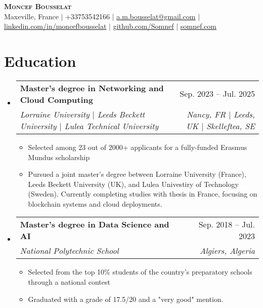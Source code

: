 \documentclass[letterpaper,11t]{article}
\makeatletter
\newcommand{\resumeItem}[1]{
  \item\small{
    {#1 \vspace{-2pt}}
  }
}
\newcommand{\resumeSubheading}[4]{
  \vspace{-2pt}\item
    \begin{tabular*}{0.97\textwidth}[t]{l@{\extracolsep{\fill}}r}
      \textbf{#1} & #2 \\
      \textit{\small#3} & \textit{\small #4} \\
    \end{tabular*}\vspace{-7pt}
}
\newcommand{\resumeSubHeadingListStart}{\begin{itemize}[leftmargin=0.15in, label={}]}
\newcommand{\resumeSubHeadingListEnd}{\end{itemize}}
\newcommand{\resumeItemListStart}{\begin{itemize}}
\newcommand{\resumeItemListEnd}{\end{itemize}\vspace{-5pt}}
\makeatother
\begin{document}

\begin{center}
    \textbf{\Huge \scshape Moncef Bousselat} \\ \vspace{1pt}
    \small Maxeville, France $|$ 
    \small +33753542166 $|$ 
    \href{mailto:a.m.bousselat@gmail.com@gmail.com}{\underline{a.m.bousselat@gmail.com}} $|$ 
    \href{https://www.linkedin.com/in/moncefbousselat/}{\underline{linkedin.com/in/moncefbousselat}} $|$
    \href{https://github.com/Somnef}{\underline{github.com/Somnef}} $|$
    \href{https://www.somnef.com}{\underline{somnef.com}}
\end{center}


\section{Education}
    \resumeSubHeadingListStart
        \resumeSubheading
        {Master's degree in Networking and Cloud Computing}{Sep. 2023 -- Jul. 2025}
        {Lorraine University $|$ Leeds Beckett University $|$ Lulea Technical University}{Nancy, FR $|$ Leeds, UK $|$ Skelleftea, SE}
            \resumeItemListStart
                \resumeItem{Selected among 23 out of 2000+ applicants for a fully-funded Erasmus Mundus scholarship}
                \resumeItem{Pursued a joint master's degree between Lorraine University (France), Leeds Beckett University (UK), and Lulea Univestiry of Technology (Sweden). Currently completing studies with thesis in France, focusing on blockchain systems and cloud deployments.}
            \resumeItemListEnd
      
        \resumeSubheading
        {Master's degree in Data Science and AI}{Sep. 2018 -- Jul. 2023}
        {National Polytechnic School}{Algiers, Algeria}
            \resumeItemListStart
                \resumeItem{Selected from the top 10\% students of the country's preparatory schools through a national contest}
                \resumeItem{Graduated with a grade of 17.5/20 and a "very good" mention.}
            \resumeItemListEnd
  \resumeSubHeadingListEnd
\end{document}
